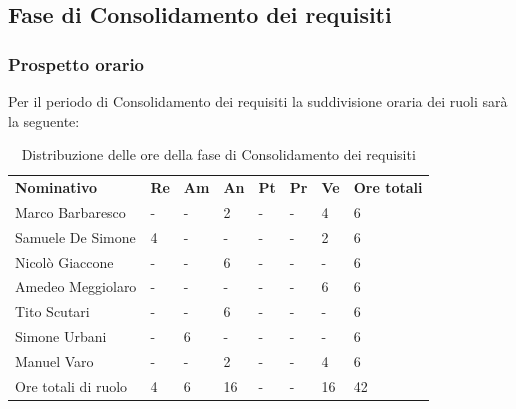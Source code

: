 \subsection{Fase di Consolidamento dei requisiti}
\subsubsection{Prospetto orario}
Per il periodo di Consolidamento dei requisiti la suddivisione oraria dei ruoli sarà la seguente:

\begin{center}
    \begin{table}[ht!]
        \centering
        \caption{Distribuzione delle ore della fase di Consolidamento dei requisiti}
        \vspace{5px}
        \renewcommand{\arraystretch}{1.8}
        \begin{tabular}{p{100px} p{20px} p{20px} p{20px} p{20px} p{20px} p{20px} p{50px} }
            \rowcolor{logo!70} \textbf{Nominativo} & \textbf{Re} & \textbf{Am} & \textbf{An} & \textbf{Pt} & \textbf{Pr} & \textbf{Ve} & \textbf{Ore totali} \\
            Marco Barbaresco                       & -           & -           & 2           & -           & -           & 4           & 6                   \\
            Samuele De Simone                      & 4           & -           & -           & -           & -           & 2           & 6                   \\
            Nicolò Giaccone                        & -           & -           & 6           & -           & -           & -           & 6                   \\
            Amedeo Meggiolaro                      & -           & -           & -           & -           & -           & 6           & 6                   \\
            Tito Scutari                           & -           & -           & 6           & -           & -           & -           & 6                   \\
            Simone Urbani                          & -           & 6           & -           & -           & -           & -           & 6                   \\
            Manuel Varo                            & -           & -           & 2           & -           & -           & 4           & 6                   \\
            Ore totali di ruolo                    & 4           & 6           & 16          & -           & -           & 16          & 42                  \\
        \end{tabular}
    \end{table}
\end{center}
\pagebreak

